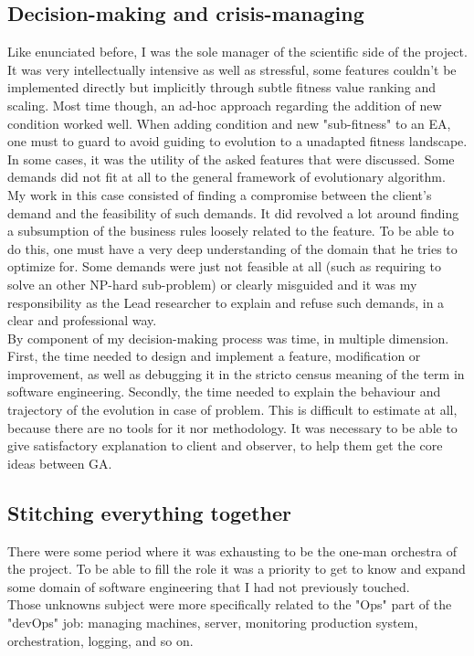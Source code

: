 \documentclass[12pt]{memoir}
\begin{document}
\subsection{Decision-making and crisis-managing}
Like enunciated before, I was the sole manager of the scientific side of the project.
It was very intellectually intensive as well as stressful, some features couldn't be
implemented directly but implicitly through subtle fitness value ranking and
scaling. Most time though, an ad-hoc approach regarding the addition of new condition
worked well. When adding condition and new "sub-fitness" to an EA, one must to guard to
avoid guiding to evolution to a unadapted fitness landscape. \\
In some cases, it was the utility of the asked features that were discussed. Some demands
did not fit at all to the general framework of evolutionary algorithm. My work in this
case consisted of finding a compromise between the client's demand and the feasibility
of such demands. It did revolved a lot around finding a subsumption of the business
rules loosely related to the feature. To be able to do this, one must have a very deep
understanding of the domain that he tries to optimize for. Some demands were just not
feasible at all (such as requiring to solve an other NP-hard sub-problem) or clearly
misguided and it was my responsibility as the Lead researcher to explain and refuse
such demands, in a clear and professional way.\\
By component of my decision-making process was time, in multiple dimension. First, the time
needed to design and implement a feature, modification or improvement, as well as
debugging it in the stricto census meaning of the term in software engineering. Secondly,
the time needed to explain the behaviour and trajectory of the evolution in case of problem.
This is difficult to estimate at all, because there are no tools for it nor methodology.
It was necessary to be able to give satisfactory explanation to client and observer,
to help them get the core ideas between GA.

\subsection{Stitching everything together}
There were some period where it was exhausting to be the one-man orchestra of the project.
To be able to fill the role it was a priority to get to know and expand some domain of
software engineering that I had not previously touched. \\
Those unknowns subject were more specifically related to the "Ops" part of the "devOps"
job: managing machines, server, monitoring production system, orchestration, logging, and so on.\\
\end{document}
